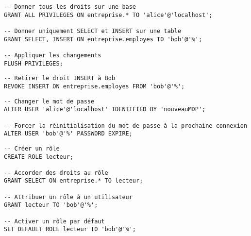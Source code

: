 \documentclass[a4paper,11pt]{article}
\begin{document}
\begin{tcolorbox}[colback=green!5!white,colframe=green!75!black,title=Accorder des privilèges (GRANT)]
\begin{verbatim}
-- Donner tous les droits sur une base
GRANT ALL PRIVILEGES ON entreprise.* TO 'alice'@'localhost';

-- Donner uniquement SELECT et INSERT sur une table
GRANT SELECT, INSERT ON entreprise.employes TO 'bob'@'%';

-- Appliquer les changements
FLUSH PRIVILEGES;
\end{verbatim}
\end{tcolorbox}

\begin{tcolorbox}[colback=yellow!5!white,colframe=yellow!75!black,title=Révoquer des privilèges (REVOKE)]
\begin{verbatim}
-- Retirer le droit INSERT à Bob
REVOKE INSERT ON entreprise.employes FROM 'bob'@'%';
\end{verbatim}
\end{tcolorbox}

\begin{tcolorbox}[colback=orange!5!white,colframe=orange!75!black,title=Gestion des mots de passe]
\begin{verbatim}
-- Changer le mot de passe
ALTER USER 'alice'@'localhost' IDENTIFIED BY 'nouveauMDP';

-- Forcer la réinitialisation du mot de passe à la prochaine connexion
ALTER USER 'bob'@'%' PASSWORD EXPIRE;
\end{verbatim}
\end{tcolorbox}

\begin{tcolorbox}[colback=purple!5!white,colframe=purple!75!black,title=Rôles (MySQL 8.0+)]
\begin{verbatim}
-- Créer un rôle
CREATE ROLE lecteur;

-- Accorder des droits au rôle
GRANT SELECT ON entreprise.* TO lecteur;

-- Attribuer un rôle à un utilisateur
GRANT lecteur TO 'bob'@'%';

-- Activer un rôle par défaut
SET DEFAULT ROLE lecteur TO 'bob'@'%';
\end{verbatim}
\end{tcolorbox}
\end{document}
